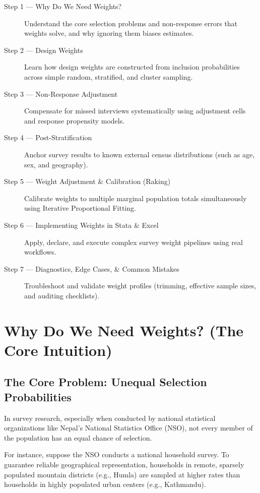 \documentclass[11pt,a4paper]{article}
\begin{document}
\begin{description}
  \item[Step 1 --- Why Do We Need Weights?] Understand the core selection problems and non-response errors that weights solve, and why ignoring them biases estimates.
  \item[Step 2 --- Design Weights] Learn how design weights are constructed from inclusion probabilities across simple random, stratified, and cluster sampling.
  \item[Step 3 --- Non-Response Adjustment] Compensate for missed interviews systematically using adjustment cells and response propensity models.
  \item[Step 4 --- Post-Stratification] Anchor survey results to known external census distributions (such as age, sex, and geography).
  \item[Step 5 --- Weight Adjustment \& Calibration (Raking)] Calibrate weights to multiple marginal population totals simultaneously using Iterative Proportional Fitting.
  \item[Step 6 --- Implementing Weights in Stata \& Excel] Apply, declare, and execute complex survey weight pipelines using real workflows.
  \item[Step 7 --- Diagnostics, Edge Cases, \& Common Mistakes] Troubleshoot and validate weight profiles (trimming, effective sample sizes, and auditing checklists).
\end{description}

\newpage

\section{Why Do We Need Weights? (The Core Intuition)}

\subsection{The Core Problem: Unequal Selection Probabilities}
In survey research, especially when conducted by national statistical organizations like Nepal's National Statistics Office (NSO), not every member of the population has an equal chance of selection. 

For instance, suppose the NSO conducts a national household survey. To guarantee reliable geographical representation, households in remote, sparsely populated mountain districts (e.g., Humla) are sampled at higher rates than households in highly populated urban centers (e.g., Kathmandu). 
\end{document}
